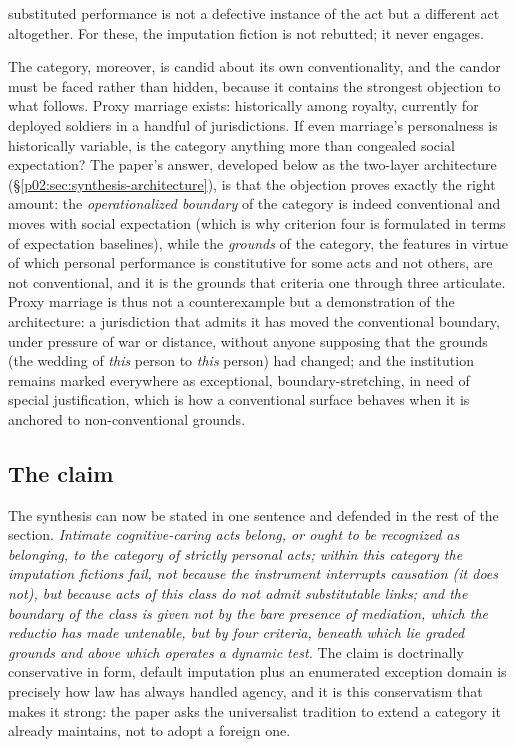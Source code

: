 substituted performance is not a defective instance of the act but a different act altogether. For these, the imputation fiction is not rebutted; it never engages.

The category, moreover, is candid about its own conventionality, and the candor must be faced rather than hidden, because it contains the strongest objection to what follows. Proxy marriage exists: historically among royalty, currently for deployed soldiers in a handful of jurisdictions. If even marriage's personalness is historically variable, is the category anything more than congealed social expectation? The paper's answer, developed below as the two-layer architecture (\S\ref{p02:sec:synthesis-architecture}), is that the objection proves exactly the right amount: the \emph{operationalized boundary} of the category is indeed conventional and moves with social expectation (which is why criterion four is formulated in terms of expectation baselines), while the \emph{grounds} of the category, the features in virtue of which personal performance is constitutive for some acts and not others, are not conventional, and it is the grounds that criteria one through three articulate. Proxy marriage is thus not a counterexample but a demonstration of the architecture: a jurisdiction that admits it has moved the conventional boundary, under pressure of war or distance, without anyone supposing that the grounds (the wedding of \emph{this} person to \emph{this} person) had changed; and the institution remains marked everywhere as exceptional, boundary-stretching, in need of special justification, which is how a conventional surface behaves when it is anchored to non-conventional grounds.

\subsection{The claim}
\label{p02:sec:synthesis-claim}

The synthesis can now be stated in one sentence and defended in the rest of the section. \emph{Intimate cognitive-caring acts belong, or ought to be recognized as belonging, to the category of strictly personal acts; within this category the imputation fictions fail, not because the instrument interrupts causation (it does not), but because acts of this class do not admit substitutable links; and the boundary of the class is given not by the bare presence of mediation, which the reductio has made untenable, but by four criteria, beneath which lie graded grounds and above which operates a dynamic test.} The claim is doctrinally conservative in form, default imputation plus an enumerated exception domain is precisely how law has always handled agency, and it is this conservatism that makes it strong: the paper asks the universalist tradition to extend a category it already maintains, not to adopt a foreign one.

